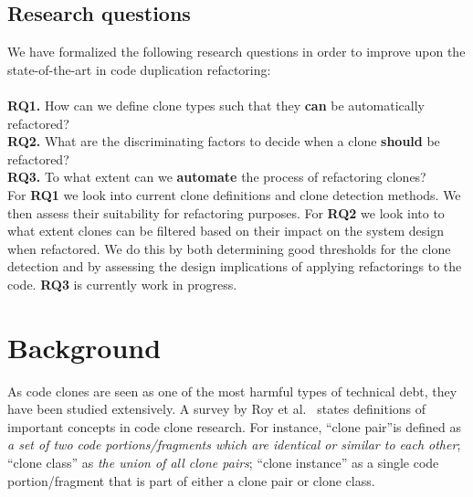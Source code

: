 \documentclass[a4paper]{article}
\begin{document}
\subsection{Research questions}
We have formalized the following research questions in order to improve upon the state-of-the-art in code duplication refactoring:
\\\\
\textbf{RQ1.} How can we define clone types such that they \textbf{can} be automatically refactored?\\
\textbf{RQ2.} What are the discriminating factors to decide when a clone \textbf{should} be refactored?\\
\textbf{RQ3.} To what extent can we \textbf{automate} the process of refactoring clones?\\

For \textbf{RQ1} we look into current clone definitions and clone detection methods. We then assess their suitability for refactoring purposes. For \textbf{RQ2} we look into to what extent clones can be filtered based on their impact on the system design when refactored. We do this by both determining good thresholds for the clone detection and by assessing the design implications of applying refactorings to the code. \textbf{RQ3} is currently work in progress.

\section{Background}\label{chap:background}
As code clones are seen as one of the most harmful types of technical debt, they have been studied extensively. A survey by Roy et al.~\cite{roy2007survey} states definitions of important concepts in code clone research. For instance, ``clone pair''is defined as \textit{a set of two code portions/fragments which are identical or similar to each other}; ``clone class'' as \textit{the union of all clone pairs}; ``clone instance'' as a single code portion/fragment that is part of either a clone pair or clone class.
\end{document}
